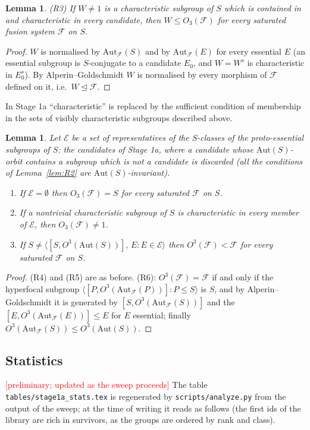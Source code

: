 \documentclass[11pt]{article}
\newtheorem{lemma}[theorem]{Lemma}
\theoremstyle{definition}
\theoremstyle{remark}
\newcommand{\F}{\mathcal{F}}
\newcommand{\Aut}{\mathrm{Aut}}
\newcommand{\gen}[1]{\langle #1 \rangle}
\begin{document}
\begin{lemma}\label{lem:R3}
{\rm (R3)} If $W\ne 1$ is a characteristic subgroup of $S$ which is contained
in and characteristic in every candidate, then $W\le O_3(\F)$ for every
saturated fusion system $\F$ on $S$.
\end{lemma}
\begin{proof}
$W$ is normalised by $\Aut_\F(S)$ and by $\Aut_\F(E)$ for every essential
$E$ (an essential subgroup is $S$-conjugate to a candidate $E_0$, and $W=W^s$
is characteristic in $E_0^s$).  By Alperin--Goldschmidt $W$ is normalised
by every morphism of $\F$ defined on it, i.e.\ $W\trianglelefteq\F$.
\end{proof}
In Stage 1a ``characteristic'' is replaced by the sufficient condition of
membership in the sets of visibly characteristic subgroups described above.

\begin{lemma}\label{lem:R456}
Let $\mathcal{E}$ be a set of representatives of the $S$-classes of the
proto-essential subgroups of $S$: the candidates of Stage 1a, where a
candidate whose $\Aut(S)$-orbit contains a subgroup which is not a
candidate is discarded (all the conditions of Lemma~\ref{lem:R2} are
$\Aut(S)$-invariant).
\begin{enumerate}
\item[(R4)] If $\mathcal{E}=\emptyset$ then $O_3(\F)=S$ for every saturated
  $\F$ on $S$.
\item[(R5)] If a nontrivial characteristic subgroup of $S$ is characteristic
  in every member of $\mathcal{E}$, then $O_3(\F)\neq1$.
\item[(R6)] If $S\ne\gen{[S,O^{3}(\Aut(S))],\,E : E\in\mathcal{E}}$ then
  $O^3(\F)<\F$ for every saturated $\F$ on $S$.
\end{enumerate}
\end{lemma}
\begin{proof}
(R4) and (R5) are as before.  (R6): $O^3(\F)=\F$ if and only if the
hyperfocal subgroup $\gen{[P,O^3(\Aut_\F(P))] : P\le S}$ is $S$, and by
Alperin--Goldschmidt it is generated by $[S,O^3(\Aut_\F(S))]$ and the
$[E,O^3(\Aut_\F(E))]\le E$ for $E$ essential; finally $O^3(\Aut_\F(S))\le
O^3(\Aut(S))$.
\end{proof}

\subsection{Statistics}\label{sec:statistics}
\textcolor{red}{[preliminary; updated as the sweep proceeds]}  The table
\texttt{tables/stage1a\_stats.tex} is regenerated by
\texttt{scripts/analyze.py} from the output of the sweep; at the time of
writing it reads as follows (the first ids of the library are rich in
survivors, as the groups are ordered by rank and class).
\end{document}
